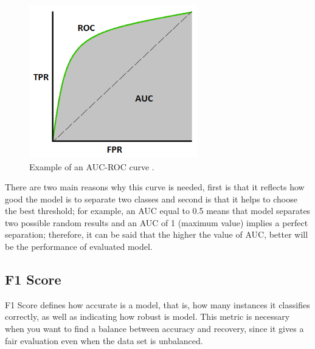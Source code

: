 \begin{figure}[h!]
  \begin{center}	\includegraphics[width=0.65\textwidth, frame]{imagenes/Cap4/auc_roc}
  \caption{Example of an AUC-ROC curve \protect\cite{Reference62}.}
  \label{fig:auc_roc}
  \end{center}
\end{figure}


\vspace{5mm} %

There are two main reasons why this curve is needed, first is that it reflects how good the model is to separate two classes and second is that it helps to choose the best threshold; for example, an AUC equal to 0.5 means that model separates two possible random results and an AUC of 1 (maximum value) implies a perfect separation; therefore, it can be said that the higher the value of AUC, better will be the performance of evaluated model. 

\subsection{F1 Score}

F1 Score defines how accurate is a model, that is, how many instances it classifies correctly, as well as indicating how robust is model. This metric is necessary when you want to find a balance between accuracy and recovery, since it gives a fair evaluation even when the data set is unbalanced.

